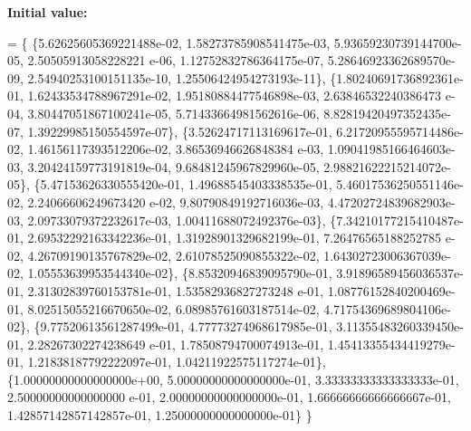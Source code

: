 {\bfseries Initial value\+:}
\begin{DoxyCode}
=
        \{
            \{5.62625605369221488e-02, 1.58273785908541475e-03, 5.93659230739144700e-05, 2.50505913058228221
      e-06, 1.12752832786364175e-07, 5.28646923362689570e-09, 2.54940253100151135e-10, 1.25506424954273193e-11\},
            \{1.80240691736892361e-01, 1.62433534788967291e-02, 1.95180884477546898e-03, 2.63846532240386473
      e-04, 3.80447051867100241e-05, 5.71433664981562616e-06, 8.82819420497352435e-07, 1.39229985150554597e-07\},
            \{3.52624717113169617e-01, 6.21720955595714486e-02, 1.46156117393512206e-02, 3.86536946626848384
      e-03, 1.09041985166464603e-03, 3.20424159773191819e-04, 9.68481245967829960e-05, 2.98821622215214072e-05\},
            \{5.47153626330555420e-01, 1.49688545403338535e-01, 5.46017536250551146e-02, 2.24066606249673420
      e-02, 9.80790849192716036e-03, 4.47202724839682903e-03, 2.09733079372232617e-03, 1.00411688072492376e-03\},
            \{7.34210177215410487e-01, 2.69532292163342236e-01, 1.31928901329682199e-01, 7.26476565188252785
      e-02, 4.26709190135767829e-02, 2.61078525090855322e-02, 1.64302723006367039e-02, 1.05553639953544340e-02\},
            \{8.85320946839095790e-01, 3.91896589456036537e-01, 2.31302839760153781e-01, 1.53582936827273248
      e-01, 1.08776152840200469e-01, 8.02515055216670650e-02, 6.08985761603187514e-02, 4.71754369689804106e-02\},
            \{9.77520613561287499e-01, 4.77773274968617985e-01, 3.11355483260339450e-01, 2.28267302274238649
      e-01, 1.78508794700074913e-01, 1.45413355434419279e-01, 1.21838187792222097e-01, 1.04211922575117274e-01\},
            \{1.00000000000000000e+00, 5.00000000000000000e-01, 3.33333333333333333e-01, 2.50000000000000000
      e-01, 2.00000000000000000e-01, 1.66666666666666667e-01, 1.42857142857142857e-01, 1.25000000000000000e-01\}
        \}
\end{DoxyCode}
